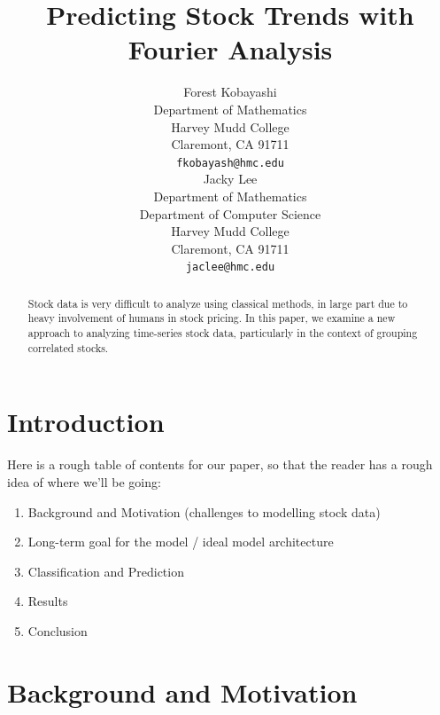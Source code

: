 \documentclass[final]{article}
\title{Predicting Stock Trends with Fourier Analysis}
\author{
  Forest Kobayashi \\
  Department of Mathematics\\
  Harvey Mudd College\\
  Claremont, CA 91711 \\
  \texttt{fkobayash@hmc.edu} \\
  \And
  Jacky Lee \\
  Department of Mathematics\\
  Department of Computer Science \\
  Harvey Mudd College \\
  Claremont, CA 91711 \\
  \texttt{jaclee@hmc.edu}
}
\begin{document}

\maketitle

\begin{abstract}
  Stock data is very difficult to analyze using classical methods, in
  large part due to heavy involvement of humans in stock pricing. In
  this paper, we examine a new approach to analyzing time-series stock
  data, particularly in the context of grouping correlated stocks.
\end{abstract}

\section{Introduction}

Here is a rough table of contents for our paper, so that the reader
has a rough idea of where we'll be going:
\begin{enumerate}
  \item Background and Motivation (challenges to modelling stock data)
  \item Long-term goal for the model / ideal model architecture
  \item Classification and Prediction
  \item Results
  \item Conclusion
\end{enumerate}

\section{Background and Motivation}
\end{document}
